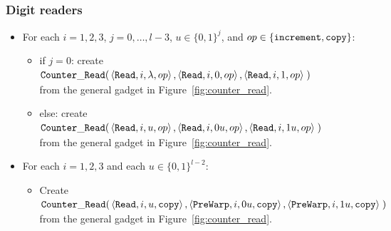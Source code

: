 \subsubsection{ Digit readers }

\begin{itemize}

\item For each $i = 1,2,3$,
               $j = 0,\ldots,l-3$,
               $u \in \{0, 1\}^j$, and
               $op \in \{{\tt increment}, {\tt copy} \}$:
    \begin{itemize}
        \item if $j = 0$:
        create
        $\begin{aligned}[t]
            {\tt Counter\_Read}(& \left\langle {\tt Read}, i, \lambda, op \right\rangle,
                     \left\langle {\tt Read}, i, 0, op \right\rangle,
                     \left\langle {\tt Read}, i, 1, op \right\rangle \;)
        \end{aligned}$\\ from the general gadget in Figure~\ref{fig:counter_read}.

        \item else:
        create
        $\begin{aligned}[t]
        {\tt Counter\_Read}(& \left\langle {\tt Read}, i, u,  op \right\rangle,
                 \left\langle {\tt Read}, i, 0u, op \right\rangle,
                 \left\langle {\tt Read}, i, 1u, op \right\rangle \;)
        \end{aligned}$\\ from the general gadget in Figure~\ref{fig:counter_read}.
    \end{itemize}

\end{itemize}


\begin{itemize}

    \item For each $i = 1,2,3$ and each $u \in \{0, 1\}^{l-2}$:

    \begin{itemize}
        \item Create $\begin{aligned}[t]
            {\tt Counter\_Read}(& \left\langle {\tt Read},    i,  u, {\tt copy} \right\rangle,
                     \left\langle {\tt PreWarp}, i, 0u, {\tt copy} \right\rangle,
                     \left\langle {\tt PreWarp}, i, 1u, {\tt copy} \right\rangle \;)
        \end{aligned}$\\from the general gadget in Figure~\ref{fig:counter_read}.
    \end{itemize}
\end{itemize}

